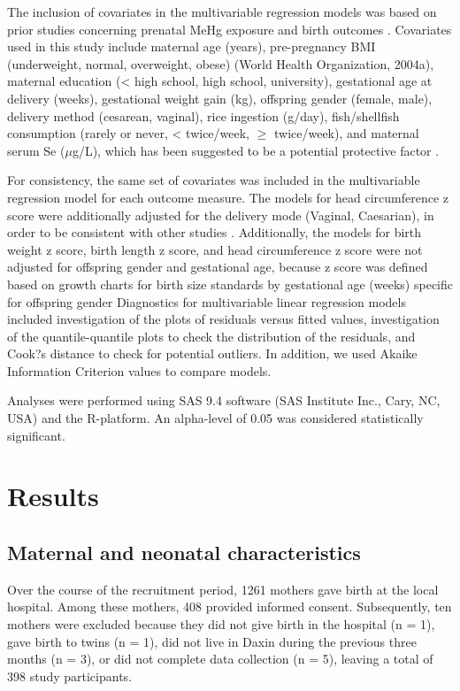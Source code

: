 The inclusion of covariates in the multivariable regression models was based on prior studies concerning prenatal MeHg exposure and birth outcomes \citep{choi2008selenium,guo2009formaldehyde,ding2013prenatal,rothenberg2016maternal,wells2016cord}. Covariates used in this study include maternal age (years), pre-pregnancy BMI (underweight, normal, overweight, obese) (World Health Organization, 2004a), maternal
education (< high school, high school, university), gestational age at delivery (weeks), gestational weight gain (kg), offspring gender (female, male), delivery method (cesarean, vaginal), rice ingestion (g/day), fish/shellfish consumption (rarely or never, < twice/week, ${\ge}$ twice/week), and maternal serum Se (${\mu}$g/L), which has been suggested to be a potential protective factor \cite{choi2008selenium,wells2016cord}.

For consistency, the same set of covariates was included in the multivariable regression model for each outcome measure. The models for head circumference z score were additionally adjusted for the delivery mode (Vaginal, Caesarian), in order to be consistent with other studies \cite{guo2009formaldehyde,wells2016cord}. Additionally, the models for birth weight z score, birth length z score, and head circumference z score were
not adjusted for offspring gender and gestational age, because z score was defined based on growth charts for birth size standards by gestational age (weeks) specific for offspring gender \cite{villar2014international} Diagnostics for multivariable linear regression models included investigation of the plots of residuals versus fitted values, investigation of the quantile-quantile plots to check the distribution of the residuals, and Cook?s distance to check for potential outliers. In addition, we used Akaike Information Criterion values to compare models. 

Analyses were performed using SAS 9.4 software (SAS Institute Inc., Cary, NC, USA) and the R-platform. An alpha-level of 0.05 was considered statistically significant.

\section{Results}

\subsection{Maternal and neonatal characteristics}

Over the course of the recruitment period, 1261 mothers gave birth at the local hospital. Among these mothers, 408 provided informed consent. Subsequently, ten mothers were excluded because they did not give birth in the hospital (n = 1), gave birth to twins (n = 1), did not live in Daxin during the previous three months (n = 3), or did not complete data collection (n = 5), leaving a total of 398 study participants. 

